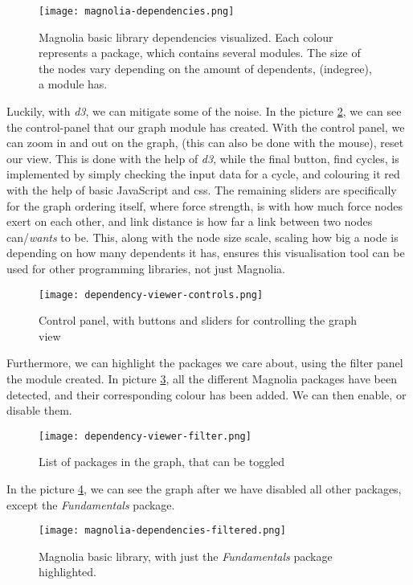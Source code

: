 \begin{figure}[H]
  \centering
  \texttt{[image: magnolia-dependencies.png]}
  \caption{
    Magnolia basic library dependencies visualized. Each colour represents a
    package, which contains several modules. The size of the nodes vary
    depending on the amount of dependents, (indegree), a module has.
  }
  \label{pic:magLib}
\end{figure}

Luckily, with \textit{d3}, we can mitigate some of the noise. In the picture
\ref{pic:depCont}, we can see the control-panel that our graph module has
created. With the control panel, we can zoom in and out on the graph,
(this can also be done with the mouse), reset our view. This is done with the
help of \textit{d3}, while the final button, find cycles, is implemented by
simply checking the input data for a cycle, and colouring it red with the help
of basic JavaScript and \gls{css}. The remaining sliders are specifically for
the graph ordering itself, where force strength, is with how much force nodes
exert on each other, and link distance is how far a link between two nodes
can/\textit{wants} to be. This, along with the node size scale, scaling how big
a node is depending on how many dependents it has, ensures this visualisation
tool can be used for other programming libraries, not just Magnolia.

\begin{figure}
  \centering
  \texttt{[image: dependency-viewer-controls.png]}
  \caption{
    Control panel, with buttons and sliders for controlling the graph view
  }
  \label{pic:depCont}
\end{figure}

Furthermore, we can highlight the packages we care about, using the filter
panel the module created. In picture \ref{pic:depFil}, all the different
Magnolia packages have been detected, and their corresponding colour has been
added. We can then enable, or disable them.

\begin{figure}
  \centering
  \texttt{[image: dependency-viewer-filter.png]}
  \caption{List of packages in the graph, that can be toggled}
  \label{pic:depFil}
\end{figure}

In the picture \ref{pic:depDis}, we can see the graph after we have disabled all
other packages, except the \textit{Fundamentals} package.

\begin{figure}
  \centering
  \texttt{[image: magnolia-dependencies-filtered.png]}
  \caption{
    Magnolia basic library, with just the \textit{Fundamentals} package
    highlighted.
  }
  \label{pic:depDis}
\end{figure}

